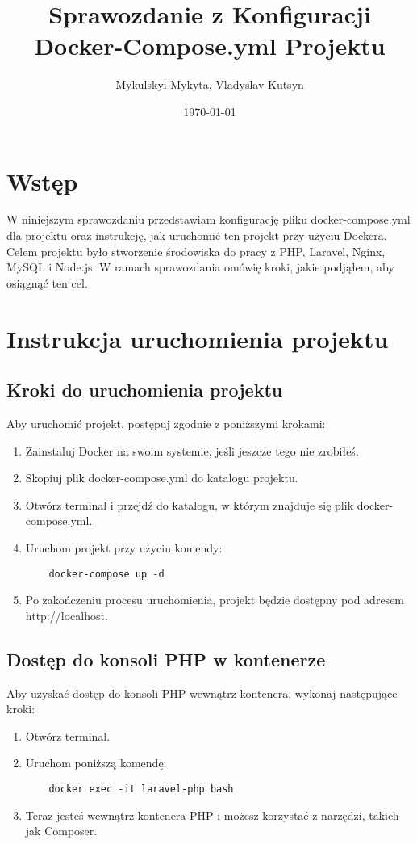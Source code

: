 \documentclass{article}
\title{Sprawozdanie z Konfiguracji Docker-Compose.yml Projektu}
\author{Mykulskyi Mykyta, Vladyslav Kutsyn}
\date{\today}
\begin{document}
\maketitle

\section{Wstęp}
W niniejszym sprawozdaniu przedstawiam konfigurację pliku docker-compose.yml dla projektu oraz instrukcję, jak uruchomić ten projekt przy użyciu Dockera. Celem projektu było stworzenie środowiska do pracy z PHP, Laravel, Nginx, MySQL i Node.js. W ramach sprawozdania omówię kroki, jakie podjąłem, aby osiągnąć ten cel.

\section{Instrukcja uruchomienia projektu}
\subsection{Kroki do uruchomienia projektu}
Aby uruchomić projekt, postępuj zgodnie z poniższymi krokami:
\begin{enumerate}
    \item Zainstaluj Docker na swoim systemie, jeśli jeszcze tego nie zrobiłeś.
    \item Skopiuj plik docker-compose.yml do katalogu projektu.
    \item Otwórz terminal i przejdź do katalogu, w którym znajduje się plik docker-compose.yml.
    \item Uruchom projekt przy użyciu komendy:
    \begin{verbatim}
    docker-compose up -d
    \end{verbatim}
    \item Po zakończeniu procesu uruchomienia, projekt będzie dostępny pod adresem http://localhost.
\end{enumerate}

\subsection{Dostęp do konsoli PHP w kontenerze}
Aby uzyskać dostęp do konsoli PHP wewnątrz kontenera, wykonaj następujące kroki:
\begin{enumerate}
    \item Otwórz terminal.
    \item Uruchom poniższą komendę:
    \begin{verbatim}
    docker exec -it laravel-php bash
    \end{verbatim}
    \item Teraz jesteś wewnątrz kontenera PHP i możesz korzystać z narzędzi, takich jak Composer.
\end{enumerate}
\end{document}
